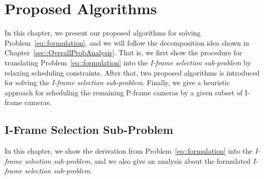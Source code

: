 \section{Proposed Algorithms}
\label{sec::proposedAlgs}
%
In this chapter, we present our proposed algorithms for solving Problem~\eqref{eq::formulation}, and we will follow the decomposition idea shown in Chapter~\ref{sec::OverallProbAnalysis}.
That is, we first show the procedure for translating Problem~\eqref{eq::formulation} into the \emph{I-frame selection sub-problem} by relaxing scheduling constraints.
After that, two proposed algorithms is introduced for solving the \emph{I-frame selection sub-problem}.
Finally, we give a heuristic approach for scheduling the remaining P-frame cameras by a given subset of I-frame cameras.
\subsection{I-Frame Selection Sub-Problem}
\label{sec::iFrameSelectionSubProb}
In this chapter, we show the derivation from Problem~\eqref{eq::formulation} into the \emph{I-frame selection sub-problem}, and we also give an analysis about the formulated \emph{I-frame selection sub-problem}.
%
